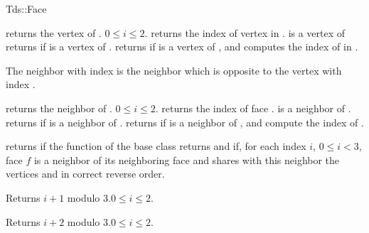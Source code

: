 \begin{ccClass}{Tds::Face}
\begin{ccAdvanced}
\end{ccAdvanced}


{returns  the vertex  of \ccVar.
\ccPrecond $0\leq i \leq 2$.}
\ccGlue
{}
{returns the index of vertex  in \ccVar. \ccPrecond {} is
a vertex of \ccVar}
\ccGlue
{}
{returns  if   is a vertex of \ccVar.}
\ccGlue
{}
{returns  if   is a vertex of \ccVar, and
 computes the index  of  in .}




The neighbor with index  is the neighbor which is opposite
to the vertex with index .


{returns  the neighbor  of \ccVar. 
\ccPrecond $0\leq i \leq 2$.
}
\ccGlue
{}
{returns the index of face .
\ccPrecond {} is a neighbor of \ccVar.}
\ccGlue
{}
{returns  if  is a neighbor of \ccVar.}
\ccGlue
{}
{returns  if  is a neighbor of \ccVar,  and
compute the index  of .}



\begin{ccAdvanced}


{returns  if  the function 
 of the base class
returns  and if, for each index $i$, $0 \le i < 3$,
face $f$ is a neighbor of its neighboring face 
and shares with this neighbor the  vertices  and 
in correct reverse order.}






\end{ccAdvanced}



{Returns $i+1$ modulo 3.\ccPrecond $0\leq i \leq 2$.}

{Returns $i+2$ modulo 3.\ccPrecond $0\leq i \leq 2$.}

\end{ccClass}

